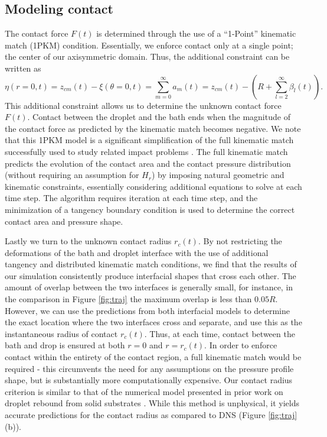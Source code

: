 \documentclass{jfm}
\begin{document}
\subsection{Modeling contact}
The contact force $F(t)$ is determined through the use of a ``1-Point'' kinematic match (1PKM) condition. Essentially, we enforce contact only at a single point; the center of our axisymmetric domain. Thus, the additional constraint can be written as
\begin{equation}
    \eta(r=0,t) = z_{cm}(t) - \xi(\theta=0,t) = \sum_{m=0}^{\infty} a_m(t) = z_{cm}(t) -\left(R + \sum_{l=2}^{\infty}\beta_l(t)\right) \text{.}
\end{equation}
This additional constraint allows us to determine the unknown contact force $F(t)$. Contact between the droplet and the bath ends when the magnitude of the contact force as predicted by the kinematic match becomes negative. We note that this 1PKM model is a significant simplification of the full kinematic match successfully used to study related impact problems \citep{galeano2017non,galeano2019quasi,galeano2021capillary}. 
The full kinematic match predicts the evolution of the
contact area and the contact pressure distribution (without requiring an assumption for $H_r$) by imposing natural geometric and kinematic constraints, essentially considering additional equations to solve at each time step. The algorithm requires iteration at each time step, and the minimization of a tangency boundary condition is used to determine the correct contact area and pressure shape.

Lastly we turn to the unknown contact radius $r_c(t)$.  By not restricting the deformations of the bath and droplet interface with the use of additional tangency and distributed kinematic match conditions, we find that the results of our simulation consistently produce interfacial shapes that cross each other. The amount of overlap between the two interfaces is generally small, for instance, in the comparison in Figure \ref{fig:traj} the maximum overlap is less than $0.05R$.    However, we can use the predictions from both interfacial models to determine the exact location where the two interfaces cross and separate, and use this as the instantaneous radius of contact $r_c(t)$. Thus, at each time, contact between the bath and drop is ensured at both $r=0$ and $r=r_c(t)$.  In order to enforce contact within the entirety of the contact region, a full kinematic match would be required - this circumvents the need for any assumptions on the pressure profile shape, but is substantially more computationally expensive. Our contact radius criterion is similar to that of the numerical model presented in prior work on droplet rebound from solid substrates \citep{molavcek2012quasi}. While this method is unphysical, it yields accurate predictions for the contact radius as compared to DNS (Figure \ref{fig:traj}(b)).
\end{document}
